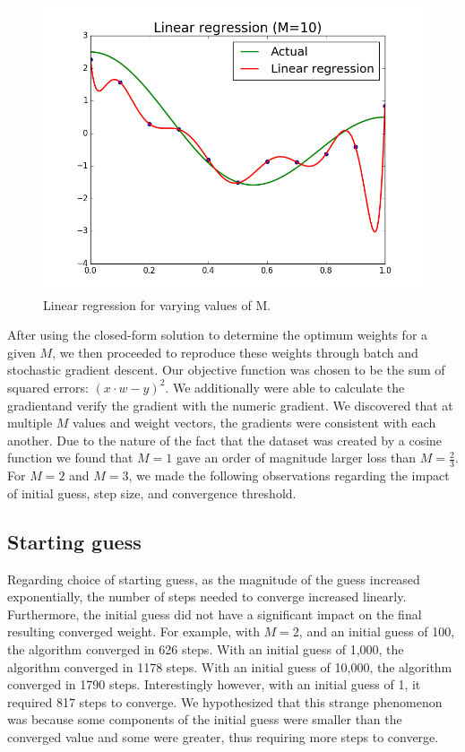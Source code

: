 \documentclass{article}
\begin{document}
\begin{figure}[width=\linewidth]
\begin{multicols}{2}
  \includegraphics[width=1.2\linewidth]{code/P2/linear_regression,10.png}
\end{multicols}
\caption{Linear regression for varying values of M.}
\end{figure}

After using the closed-form solution to determine the optimum weights for a given $M$, we then proceeded to reproduce these weights through batch and stochastic gradient descent. Our objective function was chosen to be the sum of squared errors: $(x \cdot w - y)^2$. We additionally were able to calculate the gradientand verify the gradient with the numeric gradient. We discovered that at multiple $M$ values and weight vectors, the gradients were consistent with each another. Due to the nature of the fact that the dataset was created by a cosine function we found that $M = 1$ gave an order of magnitude larger loss than $M = \frac{2}{3}$. For $M=2$ and $M=3$, we made the following observations regarding the impact of initial guess, step size, and convergence threshold.

\subsection{Starting guess}
Regarding choice of starting guess, as the magnitude of the guess increased exponentially, the number of steps needed to converge increased linearly. Furthermore, the initial guess did not have a significant impact on the final resulting converged weight. For example, with $M = 2$, and an initial guess of 100, the algorithm converged in 626 steps. With an initial guess of 1,000, the algorithm converged in 1178 steps. With an initial guess of 10,000, the algorithm converged in 1790 steps. Interestingly however, with an initial guess of 1, it required 817 steps to converge. We hypothesized that this strange phenomenon was because some components of the initial guess were smaller than the converged value and some were greater, thus requiring more steps to converge.
\end{document}
